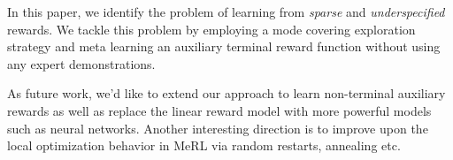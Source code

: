 In this paper, we identify the problem of learning from
{\em sparse} and {\em underspecified} rewards. We tackle this problem by employing
a mode covering exploration strategy and meta learning an auxiliary terminal
reward function without using any expert demonstrations.  

As future work, we'd like to extend our approach to
learn non-terminal auxiliary rewards as well as replace the linear reward model with more powerful models
such as neural networks. Another interesting direction is to improve upon the local optimization behavior
in MeRL via random restarts, annealing etc.